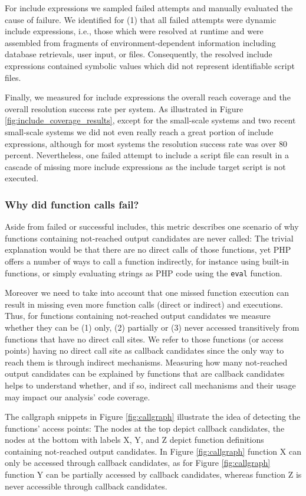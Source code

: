 \documentclass[preprint]{sig-alternate-05-2015}
\begin{document}
For include expressions we sampled failed attempts and manually evaluated the
cause of failure. We identified for (1) that all failed attempts were dynamic
include expressions, i.e., those which were resolved at runtime and were
assembled from fragments of environment-dependent information including
database retrievals, user input, or files. Consequently, the resolved include
expressions contained symbolic values which did not represent identifiable
script files.

Finally, we measured for include expressions the overall reach coverage and the
overall resolution success rate per system. As illustrated in Figure
\ref{fig:include_coverage_results}, except for the small-scale systems and two
recent small-scale systems we did not even really reach a great portion of
include expressions, although for most systems the resolution success rate was
over 80 percent. Nevertheless, one failed attempt to include a script file can
result in a cascade of missing more include expressions as the include target
script is not executed.

\subsubsection{Why did function calls fail?}
\label{WhyDidFunctionCallsFail}
Aside from failed or successful includes, this metric describes one scenario of
why functions containing not-reached output candidates are never called: The
trivial explanation would be that there are no direct calls of those functions,
yet PHP offers a number of ways to call a function indirectly, for instance
using built-in functions, or simply evaluating strings as PHP code using the
\texttt{eval} function.

Moreover we need to take into account that one missed function execution can
result in missing even more function calls (direct or indirect) and executions.
Thus, for functions containing not-reached output candidates we measure whether
they can be (1) only, (2) partially or (3) never accessed transitively from
functions that have no direct call sites. We refer to those functions (or
access points) having no direct call site as callback candidates since the only
way to reach them is through indirect mechanisms. Measuring how many
not-reached output candidates can be explained by functions that are callback
candidates helps to understand whether, and if so, indirect call mechanisms and
their usage may impact our analysis’ code coverage.

The callgraph snippets in Figure \ref{fig:callgraph} illustrate the idea of
detecting the functions’ access points: The nodes at the top depict callback
candidates, the nodes at the bottom with labels X, Y, and Z depict function
definitions containing not-reached output candidates. In Figure
\ref{fig:callgraph} function X can only be accessed through callback
candidates, as for Figure \ref{fig:callgraph} function Y can be partially
accessed by callback candidates, whereas function Z is never accessible through
callback candidates.
\end{document}
